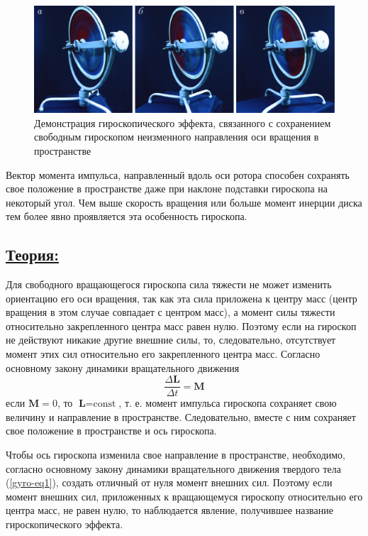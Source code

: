 \documentclass[14pt,a4paper,oneside]{extarticle}	%
\begin{document}
		\begin{figure}[H]
		\centering 		
		\includegraphics[width=0.9\linewidth]{gyro-2.png}		
		\caption{Демонстрация гироскопического эффекта, связанного с сохранением свободным гироскопом неизменного направления оси вращения в пространстве}
		\label{gyro-2}	
	\end{figure}

Вектор момента импульса, направленный вдоль оси ротора способен сохранять свое положение в пространстве даже при наклоне подставки гироскопа на некоторый угол.
Чем выше скорость вращения или больше момент инерции диска тем более явно проявляется эта особенность гироскопа.

	\newpage
	\subsection*{\underline{Теория:}}
	
	Для свободного вращающегося гироскопа сила тяжести не может изменить ориентацию его оси вращения, так как эта сила приложена к центру масс (центр вращения в этом случае совпадает с центром масс), а момент силы тяжести относительно закрепленного центра масс равен нулю.
	Поэтому если на гироскоп не действуют никакие другие внешние силы, то, следовательно, отсутствует момент этих сил относительно его закрепленного центра масс.
	Согласно основному закону динамики вращательного движения
\begin{equation}\label{gyro-eq1}
	\frac{\Delta \textbf{L}}{\Delta t} = \textbf{M}
	\end{equation} 
	если $ \textbf{M}=0 $, то $ \textbf{L} = \text{const} $, т. е. момент импульса гироскопа сохраняет свою величину и направление в пространстве.
	Следовательно, вместе с ним сохраняет свое положение в пространстве и ось гироскопа.
		
	Чтобы ось гироскопа изменила свое направление в пространстве, необходимо, согласно основному закону динамики вращательного движения твердого тела (\ref{gyro-eq1}), создать отличный от нуля момент внешних сил.
	Поэтому если момент внешних сил, приложенных к вращающемуся гироскопу относительно его центра масс, не равен нулю, то наблюдается явление, получившее название гироскопического эффекта.
	
\end{document}
